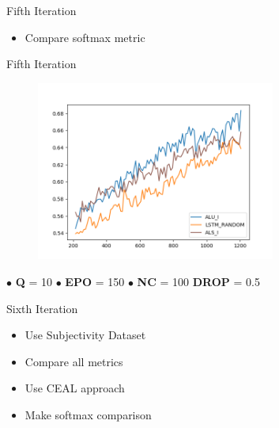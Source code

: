 \documentclass[10pt]{beamer}
\begin{document}
\begin{frame}[fragile]{Fifth Iteration}
\begin{itemize}
    \item Compare softmax metric
\end{itemize}
\end{frame}

\begin{frame}[fragile]{Fifth Iteration}
\begin{figure}[H]
    \centering
    \includegraphics[width=0.7\textwidth]{images/acl_n150_q10_softmax_bald_comparison}
\end{figure}

\hspace{0.5cm} $\bullet$ \textbf{Q} = 10 \hspace{0.5cm} $\bullet$ \textbf{EPO} = 150 \hspace{0.5cm} $\bullet$ \textbf{NC} = 100 \hspace{0.5cm} \textbf{DROP} = 0.5
\end{frame}

\begin{frame}[fragile]{Sixth Iteration}
\begin{itemize}
    \item Use Subjectivity Dataset
    \item Compare all metrics
    \item Use CEAL approach
    \item Make softmax comparison
\end{itemize}
\end{frame}
\end{document}
